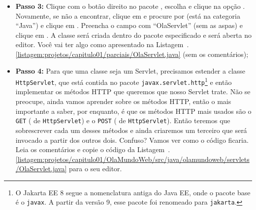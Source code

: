 \begin{itemize}
    \item \textbf{Passo 3:} Clique com o botão direito no pacote  , escolha  e clique na opção . Novamente, se não a encontrar, clique em  e procure por  (está na categoria ``Java'') e clique em . Preencha o campo  com ``OlaServlet'' (sem as aspas) e clique em . A classe será criada dentro do pacote especificado e será aberta no editor. Você vai ter algo como apresentado na Listagem~\thechapter.\ref{listagem:projetos/capitulo01/parciais/OlaServlet.java} (sem os comentários);
    
    
    \item \textbf{Passo 4:} Para que uma classe seja um Servlet, precisamos estender a classe \texttt{HttpServlet}, que está contida no pacote \texttt{javax.servlet.http}\footnote{O Jakarta EE 8 segue a nomenclatura antiga do Java EE, onde o pacote base é o \texttt{javax}. A partir da versão 9, esse pacote foi renomeado para \texttt{jakarta}.} e então implementar os métodos HTTP que queremos que nosso Servlet trate. Não se preocupe, ainda vamos aprender sobre os métodos HTTP, então o mais importante a saber, por enquanto, é que os métodos HTTP mais usados são o \texttt{GET} ( de \texttt{HttpServlet}) e o  \texttt{POST} ( de  \texttt{HttpServlet}). Então teremos que sobrescrever cada um desses métodos e ainda criaremos um terceiro que será invocado a partir dos outros dois. Confuso? Vamos ver como o código ficaria. Leia os comentários e copie o código da Listagem~\thechapter.\ref{listagem:projetos/capitulo01/OlaMundoWeb/src/java/olamundoweb/servlets/OlaServlet.java} para o seu editor.
    
\end{itemize}

\FloatBarrier
{}
\FloatBarrier
    
